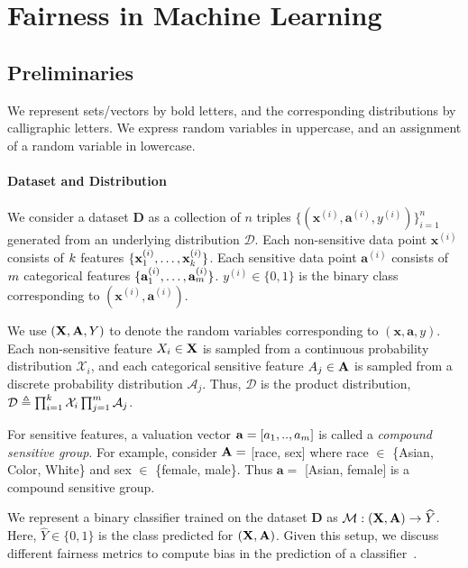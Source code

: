 \part{Fairness in Machine Learning}
\chapter{Preliminaries}
We represent sets/vectors by bold letters, and the corresponding distributions by calligraphic letters. We express random variables in uppercase, and an assignment of a random variable in lowercase.

\subsection*{Dataset and Distribution}
We consider a dataset $ \mathbf{D} $ as a collection of $n$ triples  $\{(\mathbf{x}^{(i)}, \mathbf{a}^{(i)}, y^{(i)})\}_{i=1}^n$ generated from an underlying distribution $\mathcal{D}$. Each non-sensitive data point $\mathbf{x}^{(i)}$ consists of $k$ features $\{\mathbf{x}^{(i)}_1, \dots, \mathbf{x}^{(i)}_{k}\} $. Each sensitive data point $\mathbf{a}^{(i)}$ consists of $m$ categorical features $\{\mathbf{a}^{(i)}_1, \dots, \mathbf{a}^{(i)}_{m}\} $.  $y^{(i)} \in \{0,1\}$ is the binary class corresponding to $(\mathbf{x}^{(i)}, \mathbf{a}^{(i)})$. 

We use $ (\mathbf{X}, \mathbf{A}, Y) $ to denote the random variables corresponding to $ (\mathbf{x}, \mathbf{a}, y)$.  Each non-sensitive feature $ X_i \in \mathbf{X} $ is sampled from a continuous probability distribution {$ \mathcal{X}_i $}, and each categorical sensitive feature $ A_j \in \mathbf{A} $ is sampled from a discrete probability distribution {$ \mathcal{A}_j $}. Thus, $ \mathcal{D} $ is the product distribution, $ \mathcal{D} \triangleq \prod_{i=1}^{k}\mathcal{X}_i \prod_{j=1}^{m} \mathcal{A}_j $.

For sensitive features, a valuation vector $ \mathbf{a} = [a_1, .., a_{m}] $ is called a \textit{compound sensitive group}. For example, consider $ \mathbf{A} = $ [race, sex] where race $ \in $ \{Asian, Color, White\} and sex $ \in $ \{female, male\}. Thus $ \mathbf{a} = $ [Asian, female]  is a compound sensitive group.


We represent a binary classifier trained on the dataset $\mathbf{D}$ as $\mathcal{M}: (\mathbf{X}, \mathbf{A}) \rightarrow \widehat{Y} $. Here, $\widehat{Y} \in \{0,1\}$ is the class predicted for $ (\mathbf{X}, \mathbf{A}) $. Given this setup, we discuss different fairness metrics to compute bias in the prediction of a classifier~\cite{feldman2015certifying,hardt2016equality,nabi2018fair}.


